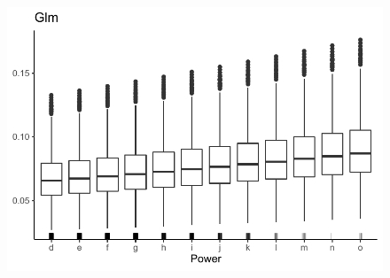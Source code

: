\begin{figure}[b]
\begin{minipage}{0.45\linewidth}
\includegraphics[scale=0.6]{Graphiques/icePowerGlm}
\end{minipage}
\end{figure}

